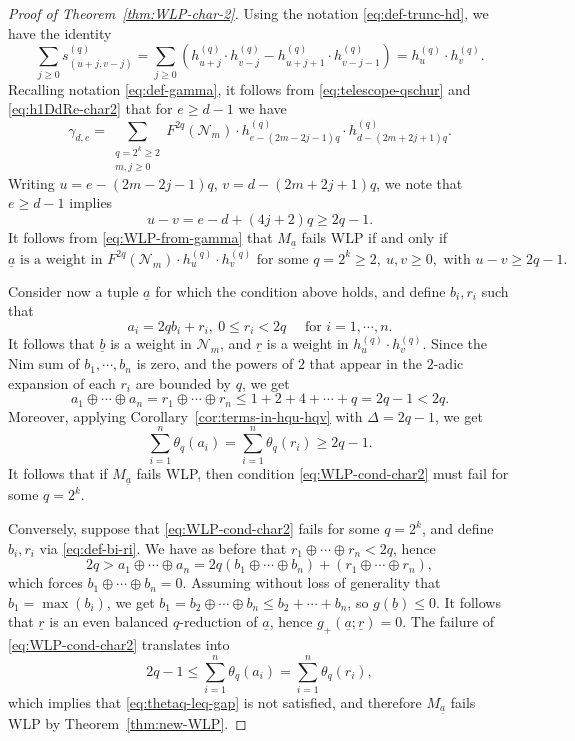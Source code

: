 \documentclass[11pt,reqno]{amsart}
\newcommand{\mc}[1]{\mathcal{#1}}
\newcommand{\ul}[1]{\underline{#1}}
\theoremstyle{definition}
\theoremstyle{remark}
\numberwithin{equation}{section}
\begin{document}
\begin{proof}[Proof of Theorem~\ref{thm:WLP-char-2}]
    Using the notation \eqref{eq:def-trunc-hd}, we have the identity
    \begin{equation}\label{eq:telescope-qschur} \sum_{j\geq 0} s^{(q)}_{(u+j,v-j)} = \sum_{j\geq 0} \left(h^{(q)}_{u+j}\cdot h^{(q)}_{v-j} - h^{(q)}_{u+j+1}\cdot h^{(q)}_{v-j-1}\right) = h^{(q)}_u\cdot h^{(q)}_v.
    \end{equation}
Recalling notation \eqref{eq:def-gamma}, it follows from \eqref{eq:telescope-qschur} and \eqref{eq:h1DdRe-char2} that for $e\geq d-1$ we have
\[ \gamma_{d,e} = \sum_{\substack{q=2^k\geq 2 \\ m,j\geq 0}} F^{2q}(\mc{N}_m)\cdot h^{(q)}_{e-(2m-2j-1)q}\cdot h^{(q)}_{d-(2m+2j+1)q}.\]
Writing $u=e-(2m-2j-1)q$, $v=d-(2m+2j+1)q$, we note that $e\geq d-1$ implies 
\[ u-v = e - d + (4j+2)q \geq 2q-1.\]
It follows from \eqref{eq:WLP-from-gamma} that $M_{\ul{a}}$ fails WLP if and only if
\[ \ul{a}\text{ is a weight in }F^{2q}(\mc{N}_m)\cdot h_u^{(q)}\cdot h_v^{(q)}\text{ for some }q=2^k\geq 2,\ u,v\geq 0,\text{ with }u-v\geq 2q-1.\]

Consider now a tuple $\ul{a}$ for which the condition above holds, and define $b_i,r_i$ such that
\begin{equation}\label{eq:def-bi-ri} a_i = 2qb_i + r_i,\ 0\leq r_i <2q\quad\text{ for }i=1,\cdots,n.
\end{equation}
It follows that $\ul{b}$ is a weight in $\mc{N}_m$, and $\ul{r}$ is a weight in $h_u^{(q)}\cdot h_v^{(q)}$. Since the Nim sum of $b_1,\cdots,b_n$ is zero, and the powers of $2$ that appear in the $2$-adic expansion of each $r_i$ are bounded by $q$, we get
\[ a_1\oplus \cdots \oplus a_n = r_1 \oplus \cdots \oplus r_n \leq 1 + 2 + 4  + \cdots + q = 2q-1 < 2q.\]
Moreover, applying Corollary~\ref{cor:terms-in-hqu-hqv} with $\Delta=2q-1$, we get
\[ \sum_{i=1}^n \theta_q(a_i) = \sum_{i=1}^n \theta_q(r_i) \geq 2q-1.\]
It follows that if $M_{\ul{a}}$ fails WLP, then condition \eqref{eq:WLP-cond-char2} must fail for some $q=2^k$.

Conversely, suppose that \eqref{eq:WLP-cond-char2} fails for some $q=2^k$, and define $b_i,r_i$ via \eqref{eq:def-bi-ri}. We have as before that $r_1\oplus\cdots\oplus r_n < 2q$, hence
\[ 2q > a_1 \oplus \cdots \oplus a_n = 2q(b_1\oplus\cdots\oplus b_n) + (r_1\oplus\cdots\oplus r_n),\]
which forces $b_1\oplus\cdots\oplus b_n=0$. Assuming without loss of generality that $b_1=\max(b_i)$, we get $b_1=b_2\oplus\cdots\oplus b_n\leq b_2+\cdots+b_n$, so $g(\ul{b})\leq 0$. It follows that $\ul{r}$ is an even balanced $q$-reduction of $\ul{a}$, hence $g_+(\ul{a};\ul{r}) = 0$. The failure of \eqref{eq:WLP-cond-char2} translates into
\[ 2q - 1 \leq \sum_{i=1}^n \theta_q(a_i) = \sum_{i=1}^n \theta_q(r_i), \]
which implies that \eqref{eq:thetaq-leq-gap} is not satisfied, and therefore $M_{\ul{a}}$ fails WLP by Theorem~\ref{thm:new-WLP}.
\end{proof}
\end{document}
